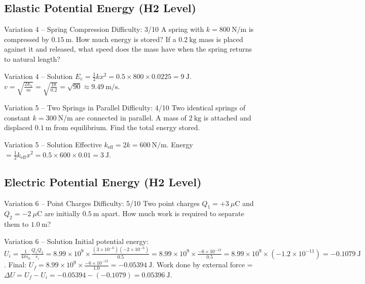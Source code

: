 \documentclass[11pt]{beamer}
\begin{document}
\subsection{Elastic Potential Energy (H2 Level)}

\begin{frame}[shrink=15]{Variation 4 – Spring Compression \hfill Difficulty: 3/10}
A spring with $k = 800\ \mathrm{N/m}$ is compressed by $0.15\ \mathrm{m}$. How much energy is stored? If a $0.2\ \mathrm{kg}$ mass is placed against it and released, what speed does the mass have when the spring returns to natural length?
\end{frame}

\begin{frame}{Variation 4 – Solution}
$E_e = \frac12 k x^2 = 0.5\times800\times0.0225 = 9\ \mathrm{J}$.
$v = \sqrt{\frac{2E_e}{m}} = \sqrt{\frac{18}{0.2}} = \sqrt{90} \approx 9.49\ \mathrm{m/s}$.
\end{frame}

\begin{frame}[shrink=15]{Variation 5 – Two Springs in Parallel \hfill Difficulty: 4/10}
Two identical springs of constant $k = 300\ \mathrm{N/m}$ are connected in parallel. A mass of $2\ \mathrm{kg}$ is attached and displaced $0.1\ \mathrm{m}$ from equilibrium. Find the total energy stored.
\end{frame}

\begin{frame}{Variation 5 – Solution}
Effective $k_{\text{eff}} = 2k = 600\ \mathrm{N/m}$. Energy $= \frac12 k_{\text{eff}} x^2 = 0.5\times600\times0.01 = 3\ \mathrm{J}$.
\end{frame}

\subsection{Electric Potential Energy (H2 Level)}

\begin{frame}[shrink=15]{Variation 6 – Point Charges \hfill Difficulty: 5/10}
Two point charges $Q_1 = +3\ \mu\mathrm{C}$ and $Q_2 = -2\ \mu\mathrm{C}$ are initially $0.5\ \mathrm{m}$ apart. How much work is required to separate them to $1.0\ \mathrm{m}$?
\end{frame}

\begin{frame}{Variation 6 – Solution}
Initial potential energy: $U_i = \frac{1}{4\pi\epsilon_0} \frac{Q_1 Q_2}{r_i} = 8.99\times10^9 \times \frac{(3\times10^{-6})(-2\times10^{-6})}{0.5} = 8.99\times10^9 \times \frac{-6\times10^{-12}}{0.5} = 8.99\times10^9 \times (-1.2\times10^{-11}) = -0.1079\ \mathrm{J}$.
Final: $U_f = 8.99\times10^9 \times \frac{-6\times10^{-12}}{1.0} = -0.05394\ \mathrm{J}$.
Work done by external force = $\Delta U = U_f - U_i = -0.05394 - (-0.1079) = 0.05396\ \mathrm{J}$.
\end{frame}
\end{document}
